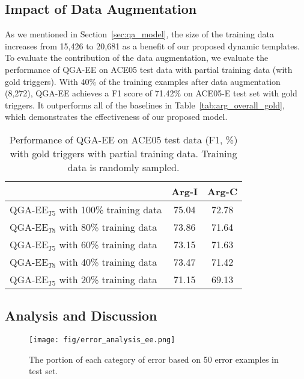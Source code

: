         

\subsection{Impact of Data Augmentation}
As we mentioned in Section~\ref{sec:qa_model}, the size of the training data increases from 15,426 to 20,681 as a benefit of our proposed dynamic templates. To evaluate the contribution of the data augmentation, we evaluate the performance of QGA-EE on ACE05 test data with partial training data (with gold triggers). With 40\% of the training examples after data augmentation (8,272), QGA-EE achieves a F1 score of 71.42\% on ACE05-E test set with gold triggers. It outperforms all of the baselines in Table~\ref{tab:arg_overall_gold}, which demonstrates the effectiveness of our proposed model.

\begin{table}[ht]
    \centering
    \small
    \begin{tabular}{l|cc}
    \hline
    {} & {Arg-I} & {Arg-C}\\
    \hline
        {QGA-EE$_{T5}$ with 100\% training data} & {75.04} & {72.78}  \\
    \hline
        
        {QGA-EE$_{T5}$ with 80\% training data} & {73.86 } & {71.64} \\
    \hline
        {QGA-EE$_{T5}$ with 60\% training data} & { 73.15 } & {71.63 } \\
    \hline
        {QGA-EE$_{T5}$ with 40\% training data} & {73.47} & {71.42} \\
    \hline
        {QGA-EE$_{T5}$ with 20\% training data} & {71.15} & {69.13} \\
    \hline
        
    \end{tabular}
    \caption{Performance of QGA-EE on ACE05 test data (F1, \%) with gold triggers with partial training data. Training data is randomly sampled.}
    \label{tab:data_aug}
\end{table}\subsection{Analysis and Discussion}
\begin{figure}[h]
    \centering
    \texttt{[image: fig/error\_analysis\_ee.png]}
    \caption{The portion of each category of error based on 50 error examples in test set.}
    \label{fig:error_analysis}
\end{figure}

